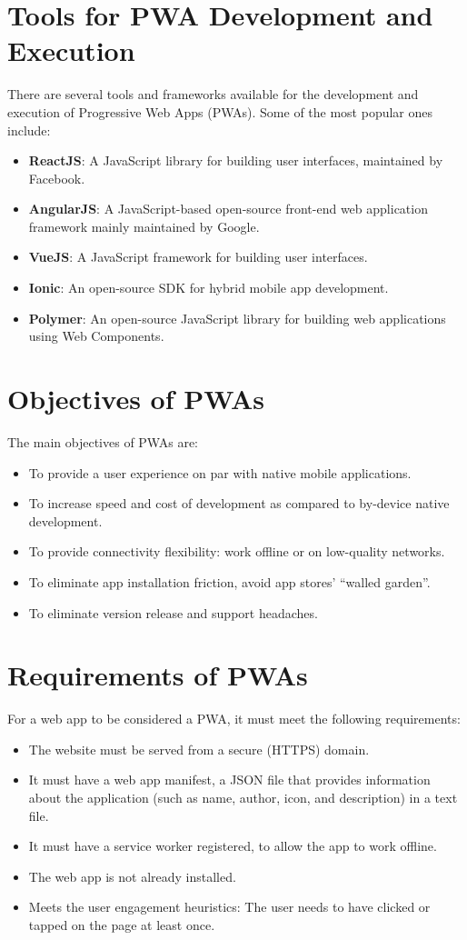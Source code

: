\documentclass[12pt]{article}
\begin{document}
	\section{Tools for PWA Development and Execution}
	There are several tools and frameworks available for the development and execution of Progressive Web Apps (PWAs). Some of the most popular ones include:
	\begin{itemize}
		\item \textbf{ReactJS}: A JavaScript library for building user interfaces, maintained by Facebook.
		\item \textbf{AngularJS}: A JavaScript-based open-source front-end web application framework mainly maintained by Google.
		\item \textbf{VueJS}: A JavaScript framework for building user interfaces.
		\item \textbf{Ionic}: An open-source SDK for hybrid mobile app development.
		\item \textbf{Polymer}: An open-source JavaScript library for building web applications using Web Components.
	\end{itemize}
	
	\section{Objectives of PWAs}
	The main objectives of PWAs are:
	\begin{itemize}
		\item To provide a user experience on par with native mobile applications.
		\item To increase speed and cost of development as compared to by-device native development.
		\item To provide connectivity flexibility: work offline or on low-quality networks.
		\item To eliminate app installation friction, avoid app stores’ “walled garden”.
		\item To eliminate version release and support headaches.
	\end{itemize}
	
	\section{Requirements of PWAs}
	For a web app to be considered a PWA, it must meet the following requirements:
	\begin{itemize}
		\item The website must be served from a secure (HTTPS) domain.
		\item It must have a web app manifest, a JSON file that provides information about the application (such as name, author, icon, and description) in a text file.
		\item It must have a service worker registered, to allow the app to work offline.
		\item The web app is not already installed.
		\item Meets the user engagement heuristics: The user needs to have clicked or tapped on the page at least once.
	\end{itemize}
	
\end{document}
